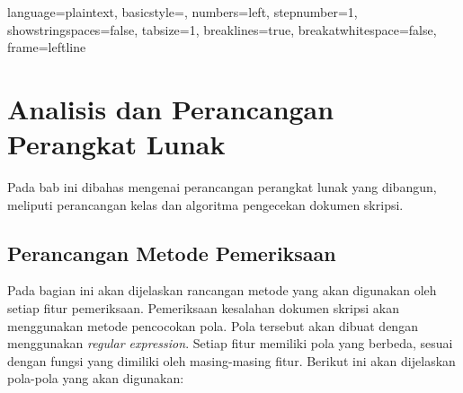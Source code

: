 
\lstset
{ 
    language=plaintext,
    basicstyle=\footnotesize,
    numbers=left,
    stepnumber=1,
    showstringspaces=false,
    tabsize=1,
    breaklines=true,
    breakatwhitespace=false,
    frame=leftline
}

\chapter{Analisis dan Perancangan Perangkat Lunak}
\label{chap:Perancangan}

Pada bab ini dibahas mengenai perancangan perangkat lunak yang dibangun, meliputi perancangan kelas dan algoritma pengecekan dokumen skripsi.

\section{Perancangan Metode Pemeriksaan}
Pada bagian ini akan dijelaskan rancangan metode yang akan digunakan oleh setiap fitur pemeriksaan. Pemeriksaan kesalahan dokumen skripsi akan menggunakan metode pencocokan pola. Pola tersebut akan dibuat dengan menggunakan \textit{regular expression}. Setiap fitur memiliki pola yang berbeda, sesuai dengan fungsi yang dimiliki oleh masing-masing fitur. Berikut ini akan dijelaskan pola-pola yang akan digunakan:

